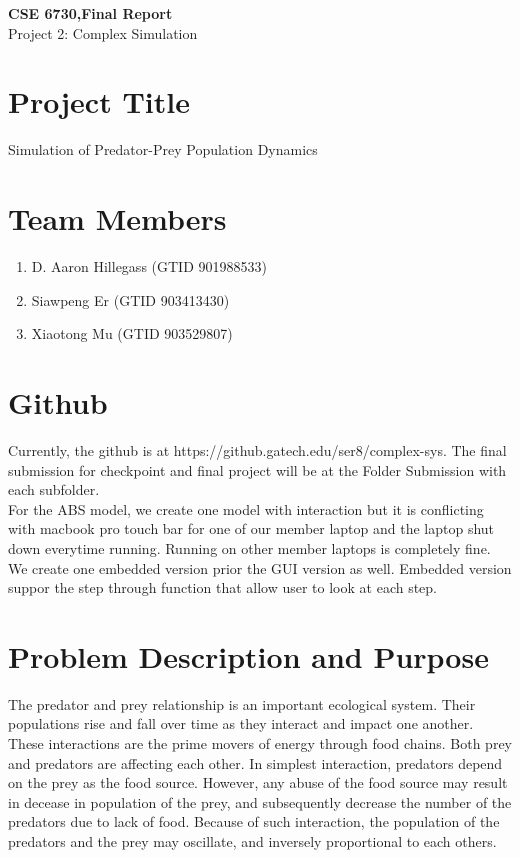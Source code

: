 \documentclass{article}
\begin{document}
	\begin{center}
		
		\LARGE{\textbf{CSE 6730,Final Report}} \\
		\vspace{1em}
		\Large{Project 2: Complex Simulation} \\
		
	\end{center}
	\begin{normalsize}
		
		\section{Project Title}
		
		Simulation of Predator-Prey Population Dynamics 
		
		\section{Team Members}
		
		\begin{enumerate}
			\item D. Aaron Hillegass (GTID 901988533)
			\item Siawpeng Er (GTID 903413430)
			\item Xiaotong Mu (GTID 903529807)
		\end{enumerate}
	
		\section{Github}
		Currently, the github is at https://github.gatech.edu/ser8/complex-sys.
		The final submission for checkpoint and final project will be at the Folder Submission with each subfolder.\\
		For the ABS model, we create one model with interaction but it is conflicting with macbook pro touch bar for one of our member laptop and the laptop shut down everytime running. Running on other member laptops is completely fine. \\
		We create one embedded version prior the GUI version as well. Embedded version suppor the step through function that allow user to look at each step.

		
		\section{Problem Description and Purpose}
		The predator and prey relationship is an important ecological system. Their populations rise and fall over time as they interact and impact one another. These interactions are the prime movers of energy through food chains. Both prey and predators are affecting each other. \cite{laham_2012_a}In simplest interaction, predators depend on the prey as the food source. However, any abuse of the food source may result in decease in population of the prey, and subsequently decrease the number of the predators due to lack of food. Because of such interaction, the population of the predators and the prey may oscillate, and inversely proportional to each others.\cite{obaid_2013_the}\
		

\end{normalsize}
\end{document}
